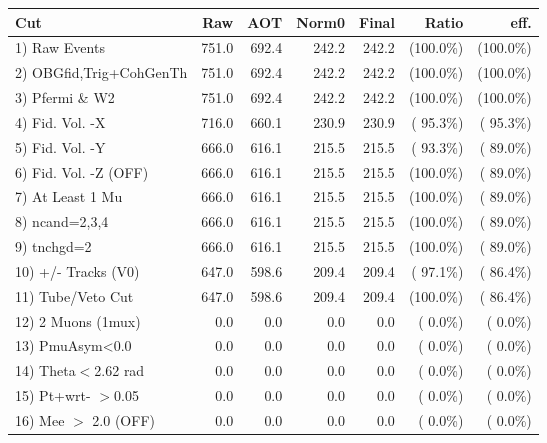  \begin{table}[h!]\centering
 \begin{tabular}{||l||r|r|r|r|r|r||}
 \hline
 \hline
 Cut & Raw & AOT & Norm0 & Final & Ratio & eff.       \\
 \hline
  1) Raw Events           &        751.0 &        692.4 &        242.2 &        242.2 & (100.0\%) & (100.0\%) \\
  2) OBGfid,Trig+CohGenTh &        751.0 &        692.4 &        242.2 &        242.2 & (100.0\%) & (100.0\%) \\
  3) Pfermi \& W2         &        751.0 &        692.4 &        242.2 &        242.2 & (100.0\%) & (100.0\%) \\
  4) Fid. Vol. -X         &        716.0 &        660.1 &        230.9 &        230.9 & ( 95.3\%) & ( 95.3\%) \\
  5) Fid. Vol. -Y         &        666.0 &        616.1 &        215.5 &        215.5 & ( 93.3\%) & ( 89.0\%) \\
  6) Fid. Vol. -Z (OFF)   &        666.0 &        616.1 &        215.5 &        215.5 & (100.0\%) & ( 89.0\%) \\
  7) At Least 1 Mu        &        666.0 &        616.1 &        215.5 &        215.5 & (100.0\%) & ( 89.0\%) \\
  8) ncand=2,3,4          &        666.0 &        616.1 &        215.5 &        215.5 & (100.0\%) & ( 89.0\%) \\
  9) tnchgd=2             &        666.0 &        616.1 &        215.5 &        215.5 & (100.0\%) & ( 89.0\%) \\
 10) +/- Tracks (V0)      &        647.0 &        598.6 &        209.4 &        209.4 & ( 97.1\%) & ( 86.4\%) \\
 11) Tube/Veto Cut        &        647.0 &        598.6 &        209.4 &        209.4 & (100.0\%) & ( 86.4\%) \\
 12) 2 Muons (1mux)       &          0.0 &          0.0 &          0.0 &          0.0 & (  0.0\%) & (  0.0\%) \\
 13) PmuAsym<0.0          &          0.0 &          0.0 &          0.0 &          0.0 & (  0.0\%) & (  0.0\%) \\
 14) Theta$<$2.62 rad     &          0.0 &          0.0 &          0.0 &          0.0 & (  0.0\%) & (  0.0\%) \\
 15) Pt+wrt- $>$0.05      &          0.0 &          0.0 &          0.0 &          0.0 & (  0.0\%) & (  0.0\%) \\
 16) Mee $>$ 2.0  (OFF)   &          0.0 &          0.0 &          0.0 &          0.0 & (  0.0\%) & (  0.0\%) \\

\end{tabular}
\end{table}
